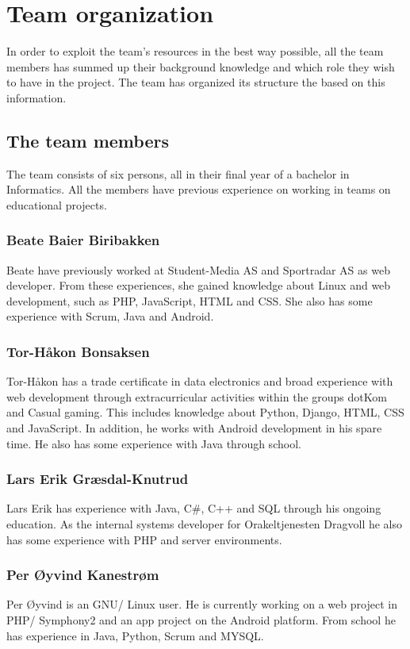 \section{Team organization}
In order to exploit the team's resources in the best way possible, all the team members has summed up their background knowledge and which role they wish to have in the project. The team has organized its structure the based on this information.

\subsection{The team members}
The team consists of six persons, all in their final year of a bachelor in Informatics. All the members have previous experience on working in teams on educational projects.

\subsubsection{Beate Baier Biribakken}
Beate have previously worked at Student-Media AS and Sportradar AS as web developer. From these experiences, she gained knowledge about Linux and web development, such as PHP, JavaScript, HTML and CSS. She also has some experience with Scrum, Java and Android.

\subsubsection{Tor-Håkon Bonsaksen}
Tor-Håkon has a trade certificate in data electronics and broad experience with web development through extracurricular activities within the groups dotKom and Casual gaming. This includes knowledge about Python, Django, HTML, CSS and JavaScript. In addition, he works with Android development in his spare time. He also has some experience with Java through school.

\subsubsection{Lars Erik Græsdal-Knutrud}
Lars Erik has experience with Java, C\#, C++ and SQL through his ongoing education. As the internal systems developer for Orakeltjenesten Dragvoll he also has some experience with PHP and server environments. 

\subsubsection{Per Øyvind Kanestrøm}
Per Øyvind is an GNU/ Linux user. He is currently working on a web project in PHP/ Symphony2 and an app project on the Android platform. From school he has experience in Java, Python, Scrum and MYSQL.


